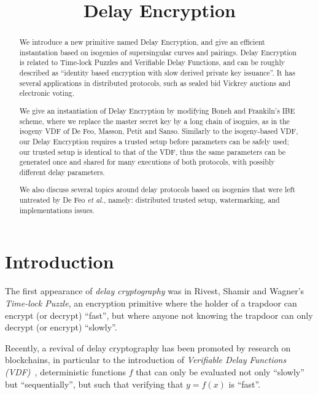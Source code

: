 \documentclass{llncs}
\title{Delay Encryption}
\begin{document}
\maketitle

\begin{abstract}
  We introduce a new primitive named Delay Encryption, and give an
  efficient instantation based on isogenies of supersingular curves
  and pairings. %
  Delay Encryption is related to Time-lock Puzzles and Verifiable
  Delay Functions, and can be roughly described as ``identity based
  encryption with slow derived private key issuance''. %
  It has several applications in distributed protocols, such as
  sealed bid Vickrey auctions and electronic voting.

  We give an instantiation of Delay Encryption by modifying Boneh and
  Frankiln's IBE scheme, where we replace the master secret key by a
  long chain of isognies, as in the isogeny VDF of De Feo, Masson, 
  Petit and Sanso. %
  Similarly to the isogeny-based VDF, our Delay Encryption requires a
  trusted setup before parameters can be safely used; our trusted
  setup is identical to that of the VDF, thus the same parameters can
  be generated once and shared for many executions of both protocols,
  with possibly different delay parameters.

  We also discuss several topics around delay protocols
  based on isogenies that were left untreated by De Feo \emph{et al.},
  namely: distributed trusted setup, watermarking, and implementations
  issues.
\end{abstract}

\section{Introduction}
\label{sec:introduction}

The first appearance of \emph{delay cryptography} was in Rivest,
Shamir and Wagner's~\cite{TLP} \emph{Time-lock Puzzle}, an encryption
primitive where the holder of a trapdoor can encrypt (or decrypt)
``fast'', but where anyone not knowing the trapdoor can only decrypt
(or encrypt) ``slowly''.

Recently, a revival of delay cryptography has been promoted by
research on blockchains, in particular to the introduction of
\emph{Verifiable Delay Functions (VDF)}~\cite{Boneh}, deterministic
functions $f$ that can only be evaluated not only ``slowly'' but
``sequentially'', but such that verifying that $y=f(x)$ is ``fast''. %
\end{document}
